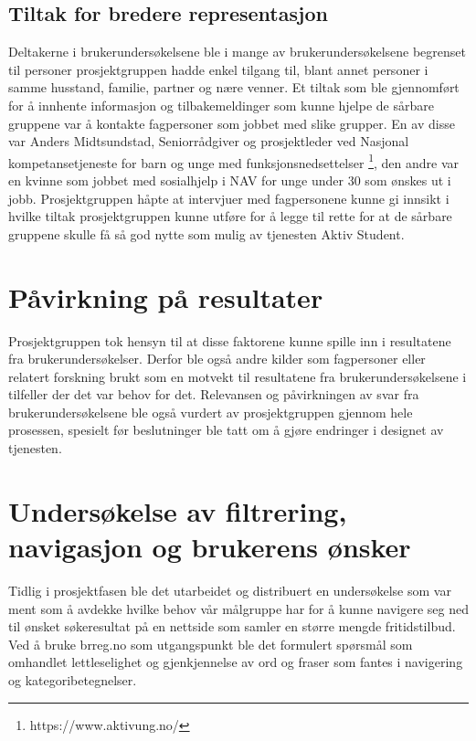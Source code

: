 \subsection{Tiltak for bredere representasjon}
Deltakerne i brukerundersøkelsene ble i mange av brukerundersøkelsene begrenset til personer prosjektgruppen hadde enkel tilgang til, blant annet personer i samme husstand, familie, partner og nære venner. Et tiltak som ble gjennomført for å innhente informasjon og tilbakemeldinger som kunne hjelpe de sårbare gruppene var å kontakte fagpersoner som jobbet med slike grupper. En av disse var Anders Midtsundstad, Seniorrådgiver og prosjektleder ved Nasjonal kompetansetjeneste for barn og unge med funksjonsnedsettelser \footnote{https://www.aktivung.no/}, den andre var en kvinne som jobbet med sosialhjelp i NAV for unge under 30 som ønskes ut i jobb. Prosjektgruppen håpte at intervjuer med fagpersonene kunne gi innsikt i hvilke tiltak prosjektgruppen kunne utføre for å legge til rette for at de sårbare gruppene skulle få så god nytte som mulig av tjenesten Aktiv Student.

\section{Påvirkning på resultater}
Prosjektgruppen tok hensyn til at disse faktorene kunne spille inn i resultatene fra brukerundersøkelser. Derfor ble også andre kilder som fagpersoner eller relatert forskning brukt som en motvekt til resultatene fra brukerundersøkelsene i tilfeller der det var behov for det. Relevansen og påvirkningen av svar fra brukerundersøkelsene ble også vurdert av prosjektgruppen gjennom hele prosessen, spesielt før beslutninger ble tatt om å gjøre endringer i designet av tjenesten. 

\section{Undersøkelse av filtrering, navigasjon og brukerens ønsker}
\label{section:google-forms-test}
Tidlig i prosjektfasen ble det utarbeidet og distribuert en undersøkelse som var ment som å avdekke hvilke behov vår målgruppe har for å kunne navigere seg ned til ønsket søkeresultat på en nettside som samler en større mengde fritidstilbud.
Ved å bruke brreg.no som utgangspunkt ble det formulert spørsmål som omhandlet lettleselighet og gjenkjennelse av ord og fraser som fantes i navigering og kategoribetegnelser.

